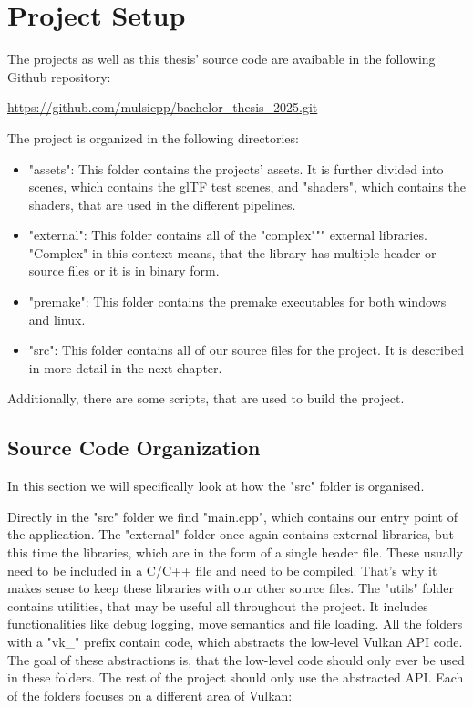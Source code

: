 
\section{Project Setup}

The projects as well as this thesis' source code are avaibable in the following Github repository:

\url{https://github.com/mulsicpp/bachelor_thesis_2025.git}

The project is organized in the following directories:

\begin{itemize}
    \item "assets": This folder contains the projects' assets. It is further divided into scenes, which contains the glTF test scenes, and "shaders", which contains the shaders, that are used in the different pipelines.
    \item "external": This folder contains all of the "complex""" external libraries. "Complex" in this context means, that the library has multiple header or source files or it is in binary form.
    \item "premake": This folder contains the premake executables for both windows and linux.
    \item "src": This folder contains all of our source files for the project. It is described in more detail in the next chapter.
\end{itemize}

Additionally, there are some scripts, that are used to build the project.

\subsection{Source Code Organization}

In this section we will specifically look at how the "src" folder is organised.

Directly in the "src" folder we find "main.cpp", which contains our entry point of the application.
The "external" folder once again contains external libraries, but this time the libraries, which are in the form of a single header file. These usually need to be included in a C/C++ file and need to be compiled. That's why it makes sense to keep these libraries with our other source files.
The "utils" folder contains utilities, that may be useful all throughout the project. It includes functionalities like debug logging, move semantics and file loading.
All the folders with a "vk\_" prefix contain code, which abstracts the low-level Vulkan API code. The goal of these abstractions is, that the low-level code should only ever be used in these folders. The rest of the project should only use the abstracted API. Each of the folders focuses on a different area of Vulkan:

